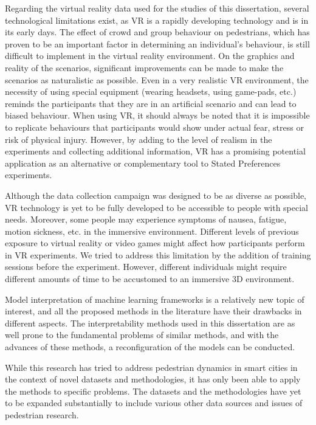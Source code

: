 Regarding the virtual reality data used for the studies of this dissertation, several technological limitations exist, as VR is a rapidly developing technology and is in its early days. The effect of crowd and group behaviour on pedestrians, which has proven to be an important factor in determining an individual's behaviour, is still difficult to implement in the virtual reality environment. On the graphics and reality of the scenarios, significant improvements can be made to make the scenarios as naturalistic as possible. Even in a very realistic VR environment, the necessity of using special equipment (wearing headsets, using game-pads, etc.) reminds the participants that they are in an artificial scenario and can lead to biased behaviour. When using VR, it should always be noted that it is impossible to
replicate behaviours that participants would show under actual fear, stress or risk of physical injury. However, by adding to the level of realism in the experiments and collecting additional information, VR has a promising potential application as an alternative or complementary tool to Stated Preferences experiments.

Although the data collection campaign was designed to be as diverse as possible, VR technology is yet to be fully developed to be accessible to people with special needs. Moreover, some people may experience symptoms of nausea, fatigue, motion sickness, etc. in the immersive environment. Different levels of previous exposure to virtual reality or video games might affect how participants perform in VR experiments. We tried to address this limitation by the addition of training sessions before the experiment. However, different individuals might require different amounts of time to be accustomed to an immersive 3D environment. 

Model interpretation of machine learning frameworks is a relatively new topic of interest, and all the proposed methods in the literature have their drawbacks in different aspects. The interpretability methods used in this dissertation are as well prone to the fundamental problems of similar methods, and with the advances of these methods, a reconfiguration of the models can be conducted. 

While this research has tried to address pedestrian dynamics in smart cities in the context of novel datasets and methodologies, it has only been able to apply the methods to specific problems. The datasets and the methodologies have yet to be expanded substantially to include various other data sources and issues of pedestrian research. 

